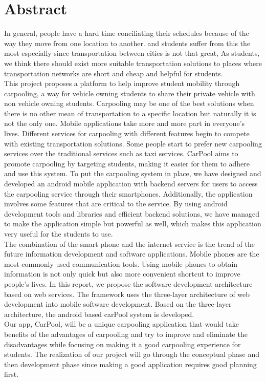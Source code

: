 \chapter*{Abstract}
In general, people have a hard time conciliating their schedules because of the way they move from one location to another.  and students suffer from this the most  especially  since transportation between cities is not that great,  As students, we think there should exist more suitable transportation solutions to places where transportation networks are short and cheap and helpful for students.\\ 

This  project  proposes  a  platform  to  help  improve student  mobility  through carpooling, a way for vehicle owning students to share their private vehicle with non vehicle owning students. Carpooling may be one of the best solutions when there is no other  mean  of  transportation  to a  specific location  but naturally  it  is not  the  only one. Mobile applications  take more  and more  part in  everyone’s  lives. Different  services for carpooling with different features begin to compete with existing transportation solutions. Some people start to  prefer  new carpooling  services  over the  traditional services such as  taxi  services. CarPool  aims  to  promote  carpooling  by  targeting  students, making it easier for them to adhere and use this system.  To put the carpooling system in place, we have designed and developed an android mobile application with backend servers for users  to  access  the  carpooling  service  through  their  smartphones.  Additionally,  the application  involves  some  features  that  are  critical  to  the  service.  By  using  android development  tools  and  libraries and  efficient backend  solutions,  we  have managed  to make the application simple but powerful as well, which makes this application very useful for the students to use.\\ 

The combination of the smart phone and the internet service is the trend of the future information development and software applications. Mobile phones are the most commonly used communication tools. Using mobile phones to obtain information is not only quick but also more convenient shortcut to improve people's lives. In this report, we propose the software development architecture based on web services. The framework uses the three-layer architecture of web development into mobile software development. Based on the three-layer architecture, the android based carPool system is developed.\\ 

Our app, CarPool, will be a unique carpooling application that would take benefits of the advantages of carpooling and try to improve and eliminate the disadvantages while focusing on making it a good carpooling experience for students. The realization of our project will go through the conceptual phase and then development phase since making a good application requires good planning first.